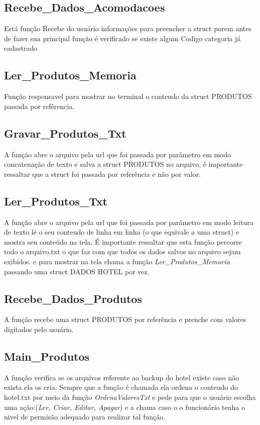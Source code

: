 \documentclass{article}
\begin{document}
\subsection{Recebe\_Dados\_Acomodacoes}	
	Está função Recebe do usuário informações para preencher a struct porem antes de fazer sua principal função é verificado se existe algum Codigo categoria já cadastrado



\subsection{Ler\_Produtos\_Memoria}
	Função responsavel para mostrar no terminal o conteudo da struct PRODUTOS passada por  refêrencia.

\subsection{Gravar\_Produtos\_Txt}
	A função abre o arquivo pela url que foi passada por parâmetro em modo concatenação de texto e salva a struct PRODUTOS  no arquivo, é importante ressaltar que  a struct foi passada por referência e não por valor.

\subsection{Ler\_Produtos\_Txt}
	A função abre o arquivo pela url que foi passada por parâmetro em modo leitura de texto lé o seu conteudo de linha em linha (o que equivale a uma struct) e mostra seu conteúdo na tela. É importante ressaltar que esta função percorre todo o arquivo.txt o que faz com que todos os dados salvos no arquivo sejam exibidos. e para mostrar na tela chama a função \textit{Ler\_Produtos\_Memoria} passando uma struct DADOS HOTEL  por vez.

\subsection{Recebe\_Dados\_Produtos}
	A função recebe uma struct  PRODUTOS por referência e prenche com valores digitados pelo usuário.

\subsection{Main\_Produtos}
	A função verifica se os arquivos referente ao backup do hotel existe caso não exista ela os cria. Sempre que a função é chamada ela ordena o conteudo do hotel.txt por meio da função \textit{OrdenaValoresTxt} e pede para que o usuário escolha uma ação:(\textit{Ler, Criar, Editar, Apagar})  e a chama caso o  o funcionário tenha o nivel de permisão adequado para realizar tal função.
\end{document}
